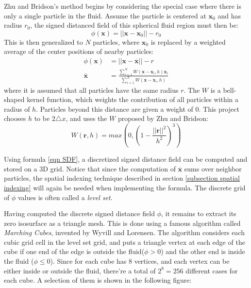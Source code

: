 Zhu and Bridson's method\cite{zhu2005animating} begins by considering the special case where there is only a single particle in the fluid. Assume the particle is centered at $\textbf{x}_0$ and has radius $r_0$, the signed distanced field of this spherical fluid region must then be:
$$
\phi(\textbf{x}) = ||\textbf{x}-\textbf{x}_0|| - r_0
$$
This is then generalized to $N$ particles, where $\textbf{x}_0$ is replaced by a weighted average of the center positions of nearby particles:
\begin{equation}
    \label{eqn SDF}
    \begin{aligned}
        \phi(\textbf{x}) &= ||\textbf{x}-\overline{\textbf{x}}|| - r \\
        \overline{\textbf{x}}&= \frac{\sum_{i=1}^{N} W(\textbf{x}-\textbf{x}_i,h)\textbf{x}_i}{\sum_{i=1}^{N} W(\textbf{x}-\textbf{x}_i,h)}
    \end{aligned}
\end{equation}
where it is assumed that all particles have the same radius $r$. The $W$ is a bell-shaped kernel function, which weights the contribution of all particles within a radius of $h$. Particles beyond this distance are given a weight of $0$. This project chooses $h$ to be $2\triangle x$, and uses the $W$ proposed by Zhu and Bridson:
$$
W(\textbf{r},h) = max(0,(1-\frac{||\textbf{r}||^2}{h^2})^3) 
$$
\begin{figure}[H]
    \centering
      
      
\end{figure}
Using formula \ref{eqn SDF}, a discretized signed distance field can be computed and stored on a 3D grid. Notice that since the computation of $\overline{\textbf{x}}$ sums over neighbor particles, the spatial indexing technique described in section \ref{subsection spatial indexing} will again be needed when implementing the formula. The discrete grid of $\phi$ values is often called a \textit{level set}\cite{bridson2015fluid}.


Having computed the discrete signed distance field $\phi$, it remains to extract its zero isosurface as a triangle mesh. This is done using a famous algorithm called \textit{Marching Cubes}, invented by Wyvill\cite{wyvill1986soft} and Lorensen\cite{lorensen1987marching}. The algorithm considers each cubic grid cell in the level set grid, and puts a triangle vertex at each edge of the cube if one end of the edge is outside the fluid($\phi>0$) and the other end is inside the fluid ($\phi\leq 0$). Since for each cube has 8 vertices, and each vertex can be either inside or outside the fluid, there're a total of $2^8=256$ different cases for each cube. A selection of them is shown in the following figure:

